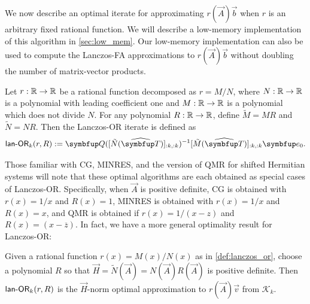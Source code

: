 We now describe an optimal iterate for approximating $r(\vec{A})\vec{b}$ when $r$ is an arbitrary fixed rational function.
We will describe a low-memory implementation of this algorithm in \cref{sec:low_mem}.
Our low-memory implementation can also be used to compute the Lanczos-FA approximations to $r(\vec{A})\vec{b}$ without doubling the number of matrix-vector products.

\begin{definition}
\label{def:lanczos_or}
    Let \( r :\mathbb{R}\to\mathbb{R} \) be a rational function decomposed as \( r = M/N \), where \( N : \mathbb{R}\to\mathbb{R} \) is a polynomial with leading coefficient one and \( M:\mathbb{R}\to\mathbb{R} \) is a polynomial which does not divide \( N \).
For any polynomial \( R : \mathbb{R}\to\mathbb{R} \), define \( \tilde{M} = MR \) and \( \tilde{N} = NR \).
Then the Lanczos-OR iterate is defined as
\begin{equation*}
    \lanopt_k(r,R)
    :=  \vec{Q}  ([\tilde{N}(\widehat{\vec{T}})]_{:k,:k})^{-1} [\tilde{M}(\widehat{\vec{T}})]_{:k,:k} \vec{e}_0.
 \end{equation*}
\end{definition}

Those familiar with CG, MINRES, and the version of QMR for shifted Hermitian systems will note that these optimal algorithms are each obtained as special cases of Lanczos-OR.
Specifically, when $\vec{A}$ is positive definite, CG is obtained with \( r(x) = 1/x \) and \( R(x) = 1 \), MINRES is obtained with $r(x) = 1/x$ and \( R(x) = x \), and QMR is obtained if $r(x) = 1/(x-z)$ and \( R(x) = (x-\overline{z}) \).
In fact, we have a more general optimality result for Lanczos-OR:
\begin{theorem}
\label{thm:lanczos_opt}
    Given a rational function $r(x) = M(x)/N(x)$ as in \cref{def:lanczos_or}, choose a polynomial $R$ so that $\vec{H} = \tilde{N}(\vec{A}) = N(\vec{A})R(\vec{A})$ is positive definite.
Then $\textup{\textsf{lan-OR}}_k(r,R)$ is the $\vec{H}$-norm optimal approximation to $r(\vec{A})\vec{v}$ from $\mathcal{K}_k$.
\end{theorem}


